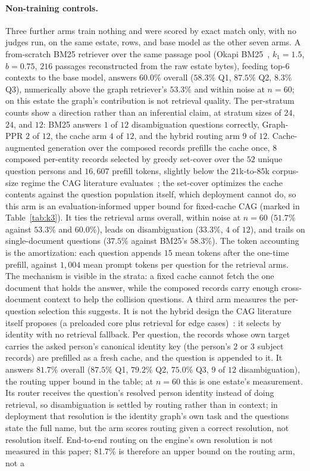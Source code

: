 \documentclass{article}
\begin{document}
\paragraph{Non-training controls.}
Three further arms train nothing and were scored by exact match only, with no judges run, on the same estate, rows, and base model as the other seven arms. A from-scratch BM25 retriever over the same passage pool (Okapi BM25~\cite{robertson2009bm25}, $k_1{=}1.5$, $b{=}0.75$, $216$ passages reconstructed from the raw estate bytes), feeding top-6 contexts to the base model, answers $60.0\%$ overall ($58.3\%$ Q1, $87.5\%$ Q2, $8.3\%$ Q3), numerically above the graph retriever's $53.3\%$ and within noise at $n{=}60$; on this estate the graph's contribution is not retrieval quality. The per-stratum counts show a direction rather than an inferential claim, at stratum sizes of $24$, $24$, and $12$: BM25 answers $1$ of $12$ disambiguation questions correctly, Graph-PPR $2$ of $12$, the cache arm $4$ of $12$, and the hybrid routing arm $9$ of $12$. Cache-augmented generation over the composed records prefills the cache once, $8$ composed per-entity records selected by greedy set-cover over the $52$ unique question persons and $16{,}607$ prefill tokens, slightly below the $21$k-to-$85$k corpus-size regime the CAG literature evaluates~\cite{chan2024cag}; the set-cover optimizes the cache contents against the question population itself, which deployment cannot do, so this arm is an evaluation-informed upper bound for fixed-cache CAG (marked in Table~\ref{tab:k3}). It ties the retrieval arms overall, within noise at $n{=}60$ ($51.7\%$ against $53.3\%$ and $60.0\%$), leads on disambiguation ($33.3\%$, $4$ of $12$), and trails on single-document questions ($37.5\%$ against BM25's $58.3\%$). The token accounting is the amortization: each question appends $15$ mean tokens after the one-time prefill, against $1{,}004$ mean prompt tokens per question for the retrieval arms. The mechanism is visible in the strata: a fixed cache cannot fetch the one document that holds the answer, while the composed records carry enough cross-document context to help the collision questions. A third arm measures the per-question selection this suggests. It is not the hybrid design the CAG literature itself proposes (a preloaded core plus retrieval for edge cases)~\cite{chan2024cag}: it selects by identity with no retrieval fallback. Per question, the records whose own target carries the asked person's canonical identity key (the person's $2$ or $3$ subject records) are prefilled as a fresh cache, and the question is appended to it. It answers $81.7\%$ overall ($87.5\%$ Q1, $79.2\%$ Q2, $75.0\%$ Q3, $9$ of $12$ disambiguation), the routing upper bound in the table; at $n{=}60$ this is one estate's measurement. Its router receives the question's resolved person identity instead of doing retrieval, so disambiguation is settled by routing rather than in context; in deployment that resolution is the identity graph's own task and the questions state the full name, but the arm scores routing given a correct resolution, not resolution itself. End-to-end routing on the engine's own resolution is not measured in this paper; 81.7\% is therefore an upper bound on the routing arm, not a 
\end{document}

